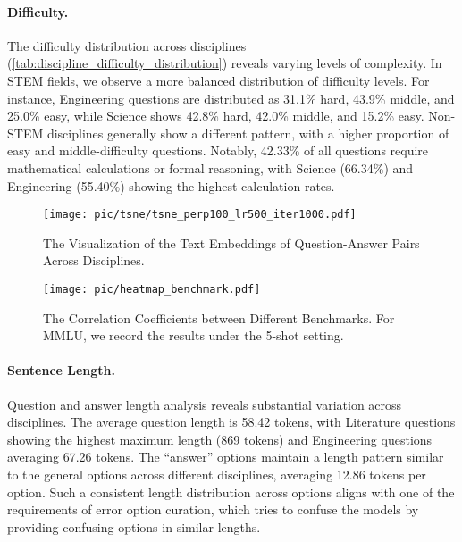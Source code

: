 \paragraph{Difficulty.} The difficulty distribution across disciplines 
(\autoref{tab:discipline_difficulty_distribution})
reveals varying levels of complexity. In STEM fields, we observe a more balanced distribution of difficulty levels. For instance, Engineering questions are distributed as 31.1\% hard, 43.9\% middle, and 25.0\% easy, while Science shows 42.8\% hard, 42.0\% middle, and 15.2\% easy. Non-STEM disciplines generally show a different pattern, with a higher proportion of easy and middle-difficulty questions. Notably, 42.33\% of all questions require mathematical calculations or formal reasoning, with Science (66.34\%) and Engineering (55.40\%) showing the highest calculation rates.

\begin{figure*}[ht]
\begin{center}
\texttt{[image: pic/tsne/tsne\_perp100\_lr500\_iter1000.pdf]}
\end{center}
\caption{The Visualization of the Text Embeddings of Question-Answer Pairs Across Disciplines.}
\label{fig:tsne}
\end{figure*}



\begin{figure}[ht]
\centering
    \centering
    \texttt{[image: pic/heatmap\_benchmark.pdf]}
    \caption{The Correlation Coefficients between Different Benchmarks. For MMLU, we record the results under the 5-shot setting.}
    \label{fig:correlation_benchmark}
\end{figure}


\paragraph{Sentence Length.} Question and answer length analysis reveals substantial variation across disciplines. The average question length is 58.42 tokens, with Literature questions showing the highest maximum length (869 tokens) and Engineering questions averaging 67.26 tokens. The ``answer'' options maintain a length pattern similar to the general options across different disciplines, averaging 12.86 tokens per option. Such a consistent length distribution across options aligns with one of the requirements of error option curation, which tries to confuse the models by providing confusing options in similar lengths.



